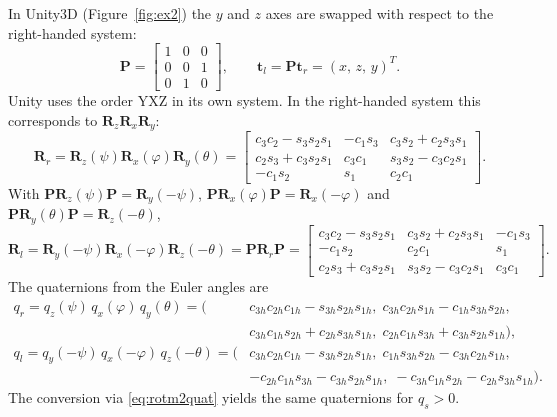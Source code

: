 \documentclass{article}
\theoremstyle{plain}
\theoremstyle{definition}
\newcommand{\vect}[1]{\boldsymbol{#1}}
\begin{document}
In Unity3D (Figure~\ref{fig:ex2}) the $y$ and $z$ axes are swapped with respect to the
right-handed system:
\begin{equation}
  \vect P = \begin{bmatrix} 1 & 0 & 0 \\ 0 & 0 & 1 \\ 0 & 1 & 0 \end{bmatrix},\qquad
  \vect t_l = \vect P \vect t_r = (x,\, z,\, y)^T .
\end{equation}
Unity uses the order YXZ in its own system. In the right-handed system this corresponds to
$\vect R_z \vect R_x \vect R_y$:
\begin{equation}
  \vect R_r = \vect R_z(\psi)\vect R_x(\varphi)\vect R_y(\theta) =
  \begin{bmatrix}
    c_3c_2 - s_3s_2s_1 & -c_1s_3 & c_3s_2 + c_2s_3s_1 \\
    c_2s_3 + c_3s_2s_1 & c_3c_1 & s_3s_2 - c_3c_2s_1 \\
    -c_1s_2 & s_1 & c_2c_1
  \end{bmatrix}.
\end{equation}
With $\vect P \vect R_z(\psi) \vect P = \vect R_y(-\psi)$, $\vect P \vect R_x(\varphi) \vect P = \vect R_x(-\varphi)$
and $\vect P \vect R_y(\theta) \vect P = \vect R_z(-\theta)$,
\begin{equation}
  \vect R_l = \vect R_y(-\psi)\vect R_x(-\varphi)\vect R_z(-\theta) = \vect P \vect R_r \vect P =
  \begin{bmatrix}
    c_3c_2 - s_3s_2s_1 & c_3s_2 + c_2s_3s_1 & -c_1s_3 \\
    -c_1s_2 & c_2c_1 & s_1 \\
    c_2s_3 + c_3s_2s_1 & s_3s_2 - c_3c_2s_1 & c_3c_1
  \end{bmatrix}.
\end{equation}
The quaternions from the Euler angles are
\begin{align}
  q_r = q_z(\psi)\,q_x(\varphi)\,q_y(\theta) = \bigl(
    &c_{3h}c_{2h}c_{1h} - s_{3h}s_{2h}s_{1h},\;
     c_{3h}c_{2h}s_{1h} - c_{1h}s_{3h}s_{2h}, \nonumber\\
    &c_{3h}c_{1h}s_{2h} + c_{2h}s_{3h}s_{1h},\;
     c_{2h}c_{1h}s_{3h} + c_{3h}s_{2h}s_{1h} \bigr), \\
  q_l = q_y(-\psi)\,q_x(-\varphi)\,q_z(-\theta) = \bigl(
    &c_{3h}c_{2h}c_{1h} - s_{3h}s_{2h}s_{1h},\;
     c_{1h}s_{3h}s_{2h} - c_{3h}c_{2h}s_{1h}, \nonumber\\
    &-c_{2h}c_{1h}s_{3h} - c_{3h}s_{2h}s_{1h},\;
     -c_{3h}c_{1h}s_{2h} - c_{2h}s_{3h}s_{1h} \bigr).
\end{align}
The conversion via \eqref{eq:rotm2quat} yields the same quaternions for $q_s > 0$.
\end{document}
